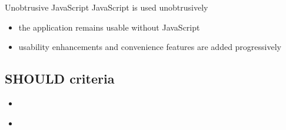 \documentclass{beamer}
\begin{document}
\begin{frame}{Unobtrusive JavaScript}
  JavaScript is used unobtrusively

  \begin{itemize}
    \item the application remains usable without JavaScript
    \item usability enhancements and convenience features are added progressively
  \end{itemize}
\end{frame}

\subsection{SHOULD criteria}

\begin{frame}{}

  \begin{itemize}
    \item
  \end{itemize}
\end{frame}

\begin{frame}{}
  \begin{itemize}
    \item
  \end{itemize}
\end{frame}
\end{document}
